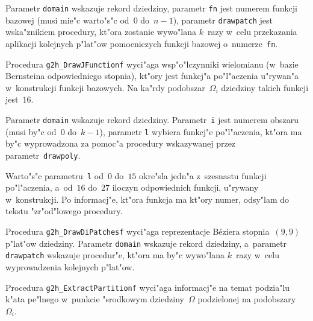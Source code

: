 Parametr \texttt{domain} wskazuje rekord dziedziny, parametr \texttt{fn}
jest numerem funkcji bazowej (musi mie"c warto"s"c od~$0$ do~$n-1$),
parametr \texttt{drawpatch} jest wska"znikiem procedury, kt"ora zostanie
wywo"lana $k$~razy w~celu przekazania aplikacji kolejnych p"lat"ow
pomocniczych funkcji bazowej o~numerze~\texttt{fn}.

\vspace{\bigskipamount}
Procedura \texttt{g2h\_DrawJFunctionf} wyci"aga wsp"o"lczynniki wielomianu
(w~bazie Bernsteina odpowiedniego stopnia), kt"ory jest funkcj"a po"l"aczenia
u"rywan"a w~konstrukcji funkcji bazowych. Na ka"rdy podobszar~$\varOmega_i$
dziedziny takich funkcji jest~$16$.

Parametr \texttt{domain} wskazuje rekord dziedziny. Parametr~\texttt{i}
jest numerem obszaru (musi by"c od~$0$ do~$k-1$), parametr \texttt{l} wybiera
funkcj"e po"l"aczenia, kt"ora ma by"c wyprowadzona za pomoc"a procedury
wskazywanej przez parametr~\texttt{drawpoly}.

Warto"s"c parametru~\texttt{l} od~$0$ do~$15$ okre"sla jedn"a z~szesnastu
funkcji po"l"aczenia, a~od~$16$ do~$27$ iloczyn odpowiednich funkcji, u"rywany
w~konstrukcji. Po informacj"e, kt"ora funkcja ma kt"ory numer, odsy"lam
do tekstu "zr"od"lowego procedury.

\vspace{\bigskipamount}
\begin{sloppypar}
Procedura \texttt{g2h\_DrawDiPatchesf} wyci"aga reprezentacje B\'{e}ziera
stopnia~$(9,9)$ p"lat"ow dziedziny. Parametr \texttt{domain} wskazuje
rekord dziedziny, a~parametr \texttt{drawpatch} wskazuje procedur"e, kt"ora
ma by"c wywo"lana $k$~razy w~celu wyprowadzenia kolejnych p"lat"ow.%
\end{sloppypar}

\vspace{\bigskipamount}
Procedura \texttt{g2h\_ExtractPartitionf} wyci"aga informacj"e na temat
podzia"lu k"ata pe"lnego w~punkcie "srodkowym dziedziny~$\varOmega$
podzielonej na podobszary~$\varOmega_i$.

